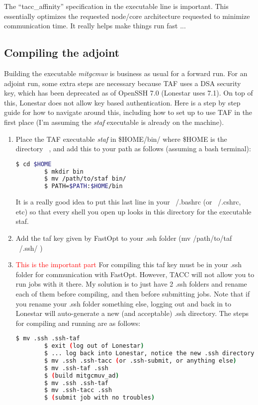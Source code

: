 \documentclass[a4paper,11pt]{article}
\newcommand{\red}[1]{\textcolor{red}{#1}}
\begin{document}
	The ``tacc\_affinity'' specification in the executable line is important. This essentially optimizes the requested node/core architecture requested to minimize communication time. It really helps make things run fast ...

	\subsection{Compiling the adjoint} 
	Building the executable \textit{mitgcmuv} is business as usual for a forward run. For an adjoint run, some extra steps are necessary because TAF uses a DSA security key, which has been deprecated as of OpenSSH 7.0 (Lonestar uses 7.1). On top of this, Lonestar does not allow key based authentication. Here is a step by step guide for how to navigate around this, including how to set up to use TAF in the first place (I'm assuming the \textit{staf} executable is already on the machine). 


	\begin{enumerate}
	  \item Place the TAF executable \textit{staf} in \$HOME/bin/ where \$HOME is the directory ~, and add this to your path as follows (assuming a bash terminal): 

	  \begin{lstlisting}[language=bash]
		$ cd $HOME
		$ mkdir bin
		$ mv /path/to/staf bin/
	 	$ PATH=$PATH:$HOME/bin
	  \end{lstlisting}

	It is a really good idea to put this last line in your ~/.bashrc (or ~/.cshrc, etc) so that every shell you open up looks in this directory for the executable staf. 

	\item Add the taf key given by FastOpt to your .ssh folder (mv /path/to/taf ~/.ssh/ )
	\item \red{This is the important part} For compiling this taf key must be in your .ssh folder for communication with FastOpt. However, TACC will not allow you to run jobs with it there. My solution is to just have 2 .ssh folders and rename each of them before compiling, and then before submitting jobs. Note that if you rename your .ssh folder something else, logging out and back in to Lonestar will auto-generate a new (and acceptable) .ssh directory. The steps for compiling and running are as follows:  

	  \begin{lstlisting}[language=bash]
		$ mv .ssh .ssh-taf
		$ exit (log out of Lonestar) 
		$ ... log back into Lonestar, notice the new .ssh directory
		$ mv .ssh .ssh-tacc (or .ssh-submit, or anything else) 
		$ mv .ssh-taf .ssh
		$ (build mitgcmuv_ad) 
		$ mv .ssh .ssh-taf 
		$ mv .ssh-tacc .ssh
		$ (submit job with no troubles) 

	  \end{lstlisting} 

	\end{enumerate}
	
\end{document}

